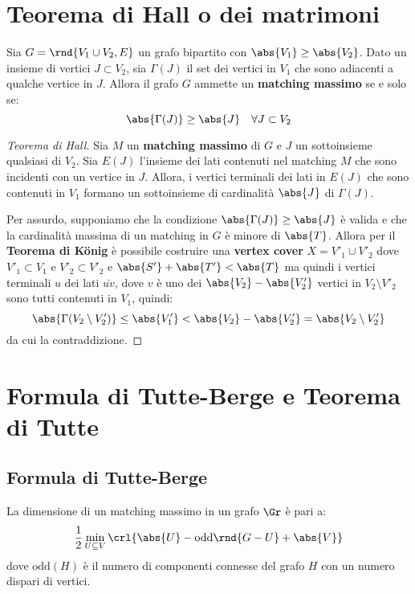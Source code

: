 \documentclass[\main/main.tex]{subfiles}
\begin{document}
\section{Teorema di Hall o dei matrimoni}
\begin{theorem}
	Sia \(G = \rnd{V_1 \cup V_2, E}\) un grafo bipartito con \(\abs{V_1} \geq \abs{V_2}\). Dato un insieme di vertici \(J \subset V_2\), sia \(\Gamma(J) \) il set dei vertici in \(V_1\) che sono adiacenti a qualche vertice in \(J\). Allora il grafo \(G\) ammette un \textbf{matching massimo} se e solo se:
	\[
		\abs{\Gamma(J)} \geq \abs{J} \quad \forall J \subset V_2
	\]
\end{theorem}

\begin{proof}[Teorema di Hall]
	Sia \(M\) un \textbf{matching massimo} di \(G\) e \(J\) un sottoinsieme qualsiasi di \(V_2\). Sia \(E(J)\) l'insieme dei lati contenuti nel matching \(M\) che sono incidenti con un vertice in \(J\). Allora, i vertici terminali dei lati in \(E(J)\) che sono contenuti in \(V_1\) formano un sottoinsieme di cardinalità \(\abs{J}\) di \(\Gamma(J)\).

	Per assurdo, supponiamo che la condizione \(\abs{\Gamma(J)} \geq \abs{J}\) è valida e che la cardinalità massima di un matching in \(G\) è minore di \(\abs{T}\). Allora per il \textbf{Teorema di König} è possibile costruire una \textbf{vertex cover} \(X=V'_1 \cup V'_2\) dove \(V'_1 \subset V_1\) e \(V'_2 \subset V'_2\) e \(\abs{S'} + \abs{T'} < \abs{T}\) ma quindi i vertici terminali \(u\) dei lati \(\bar{uv}\), dove \(v\) è uno dei \(\abs{V_2} - \abs{V'_2}\) vertici in \(V_2\setminus V'_2\) sono tutti contenuti in \(V_1\), quindi:
	\[
		\abs{\Gamma(V_2\setminus V'_2)} \leq \abs{V'_1} < \abs{V_2} - \abs{V'_2} = \abs{V_2\setminus V'_2}
	\]
	da cui la contraddizione.
\end{proof}

\section{Formula di Tutte-Berge e Teorema di Tutte}
\subsection{Formula di Tutte-Berge}
\begin{theorem}
	La dimensione di un matching massimo in un grafo \(\Gr \) è pari a:
	\[
		\frac{1}{2} \min_{U \subseteq V} \crl{\abs{U} - \text{odd}\rnd{G-U} + \abs{V}}
	\]
	dove \(\text{odd}(H)\) è il numero di componenti connesse del grafo \(H\) con un numero dispari di vertici.
\end{theorem}
\end{document}
